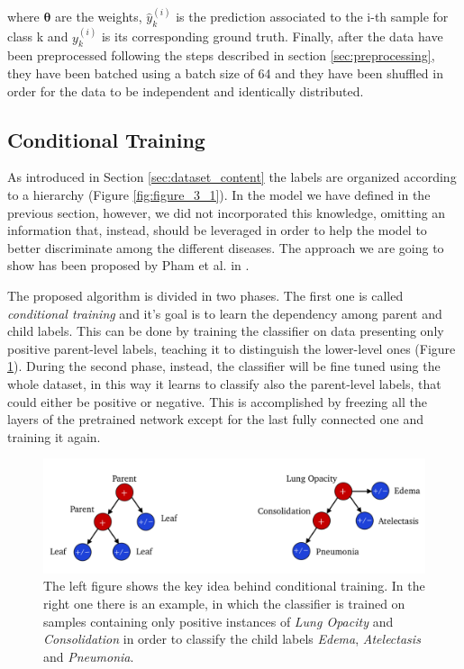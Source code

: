 \noindent where $\boldsymbol{\theta}$ are the weights, $\hat{y}_{k}^{(i)}$ is the prediction associated to the i-th sample for class k and $y_{k}^{(i)}$ is its corresponding ground truth.
Finally, after the data have been preprocessed following the steps described in section \ref{sec:preprocessing}, they have been batched using a batch size of 64 and they have been shuffled in order for the data to be independent and identically distributed.

\subsection{Conditional Training}
\label{sec:conditional_training}
As introduced in Section \ref{sec:dataset_content} the labels are organized according to a hierarchy (Figure \ref{fig:figure_3_1}). In the model we have defined in the previous section, however, we did not incorporated this knowledge, omitting an information that, instead, should be leveraged in order to help the model to better discriminate among the different diseases. The approach we are going to show has been proposed by Pham et al. in \cite{pham2019interpreting}. 

\vspace{5mm}

The proposed algorithm is divided in two phases. The first one is called \textit{conditional training} and it's goal is to learn the dependency among parent and child labels. This can be done by training the classifier on data presenting only positive parent-level labels, teaching it to distinguish the lower-level ones (Figure \ref{fig:figure_4.3}). During the second phase, instead, the classifier will be fine tuned using the whole dataset, in this way it learns to classify also the parent-level labels, that could either be positive or negative. This is accomplished by freezing all the layers of the pretrained network except for the last fully connected one and training it again. 


\begin{figure}[htbp!]
\centering

\includegraphics[scale=0.37]{Tesi/images/Conditional Training.png}
\caption[Conditional Training Example]{The left figure shows the key idea behind conditional training. In the right one there is an example, in which the classifier is trained on samples containing only positive instances of \textit{Lung Opacity} and \textit{Consolidation} in order to classify the child labels \textit{Edema}, \textit{Atelectasis} and \textit{Pneumonia}.}
\label{fig:figure_4.3}
\end{figure}

